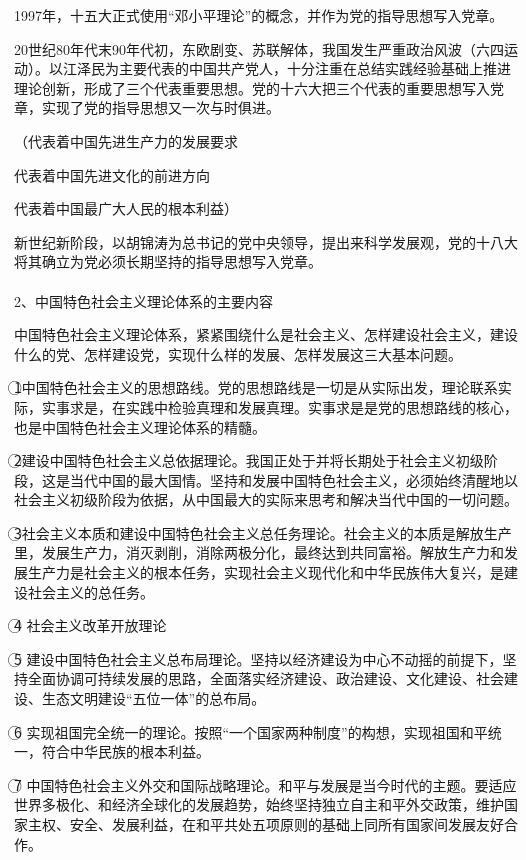 \documentclass{ctexart}
\begin{document}
1997年，十五大正式使用“邓小平理论”的概念，并作为党的指导思想写入党章。

20世纪80年代末90年代初，东欧剧变、苏联解体，我国发生严重政治风波（六四运动）。以江泽民为主要代表的中国共产党人，十分注重在总结实践经验基础上推进理论创新，形成了三个代表重要思想。党的十六大把三个代表的重要思想写入党章，实现了党的指导思想又一次与时俱进。

（代表着中国先进生产力的发展要求

代表着中国先进文化的前进方向

代表着中国最广大人民的根本利益）

新世纪新阶段，以胡锦涛为总书记的党中央领导，提出来科学发展观，党的十八大将其确立为党必须长期坚持的指导思想写入党章。
\\\\

2、中国特色社会主义理论体系的主要内容

中国特色社会主义理论体系，紧紧围绕什么是社会主义、怎样建设社会主义，建设什么的党、怎样建设党，实现什么样的发展、怎样发展这三大基本问题。

\textcircled{1}中国特色社会主义的思想路线。党的思想路线是一切是从实际出发，理论联系实际，实事求是，在实践中检验真理和发展真理。实事求是是党的思想路线的核心，也是中国特色社会主义理论体系的精髓。

\textcircled{2}建设中国特色社会主义总依据理论。我国正处于并将长期处于社会主义初级阶段，这是当代中国的最大国情。坚持和发展中国特色社会主义，必须始终清醒地以社会主义初级阶段为依据，从中国最大的实际来思考和解决当代中国的一切问题。

\textcircled{3}社会主义本质和建设中国特色社会主义总任务理论。社会主义的本质是解放生产里，发展生产力，消灭剥削，消除两极分化，最终达到共同富裕。解放生产力和发展生产力是社会主义的根本任务，实现社会主义现代化和中华民族伟大复兴，是建设社会主义的总任务。

\textcircled{4}
社会主义改革开放理论

\textcircled{5}
建设中国特色社会主义总布局理论。坚持以经济建设为中心不动摇的前提下，坚持全面协调可持续发展的思路，全面落实经济建设、政治建设、文化建设、社会建设、生态文明建设“五位一体”的总布局。

\textcircled{6}
实现祖国完全统一的理论。按照“一个国家两种制度”的构想，实现祖国和平统一，符合中华民族的根本利益。

\textcircled{7}
中国特色社会主义外交和国际战略理论。和平与发展是当今时代的主题。要适应世界多极化、和经济全球化的发展趋势，始终坚持独立自主和平外交政策，维护国家主权、安全、发展利益，在和平共处五项原则的基础上同所有国家间发展友好合作。
\end{document}
